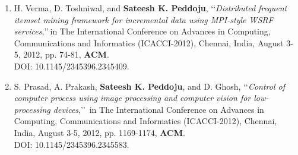 \begin{enumerate}
	\item
	H. Verma, D. Toshniwal, and  \textbf{Sateesh K. Peddoju}, \lq\lq \textit{Distributed frequent itemset mining framework for incremental data using MPI-style WSRF services},\rq\rq\,in The International Conference on Advances in Computing, Communications and Informatics (ICACCI-2012), Chennai, India, August 3-5, 2012, pp. 74-81, \textbf{ACM}. \\DOI: 10.1145/2345396.2345409.
	
	\item
	S. Prasad, A. Prakash, \textbf{Sateesh K. Peddoju}, and D. Ghosh, \lq\lq \textit{Control of computer process using image processing and computer vision for low-processing devices},\rq\rq\, in The International Conference on Advances in Computing, Communications and Informatics (ICACCI-2012), Chennai, India, August 3-5, 2012, pp. 1169-1174, \textbf{ACM}. \\DOI: 10.1145/2345396.2345583.
	
	\end{enumerate}